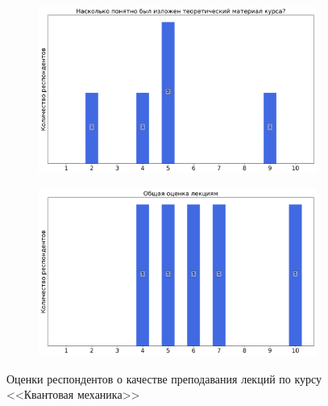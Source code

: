 \begin{figure}[H]
\begin{subfigure}[b]{0.45\textwidth}
			\end{subfigure}
			\begin{subfigure}[b]{0.45\textwidth}
				\centering
				\includegraphics[width=\textwidth]{images/4 course/Квантовая механика/lecturer-marks-Иванов М.Г.-2.png}
			\end{subfigure}	
			\begin{subfigure}[b]{0.45\textwidth}
				\centering
				\includegraphics[width=\textwidth]{images/4 course/Квантовая механика/lecturer-marks-Иванов М.Г.-3.png}
			\end{subfigure}
			\caption{Оценки респондентов о качестве преподавания лекций по курсу <<Квантовая механика>>}
		\end{figure}

